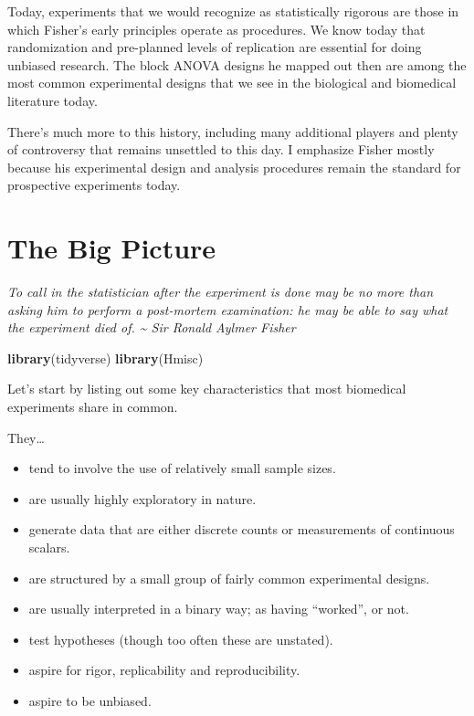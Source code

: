 \documentclass[]{book}
\newenvironment{Shaded}{\begin{snugshade}}{\end{snugshade}}
\newcommand{\KeywordTok}[1]{\textcolor[rgb]{0.13,0.29,0.53}{\textbf{#1}}}
\newcommand{\NormalTok}[1]{#1}
\providecommand{\tightlist}{%
  \setlength{\itemsep}{0pt}\setlength{\parskip}{0pt}}
\begin{document}
Today, experiments that we would recognize as statistically rigorous are those in which Fisher's early principles operate as procedures. We know today that randomization and pre-planned levels of replication are essential for doing unbiased research. The block ANOVA designs he mapped out then are among the most common experimental designs that we see in the biological and biomedical literature today.

There's much more to this history, including many additional players and plenty of controversy that remains unsettled to this day. I emphasize Fisher mostly because his experimental design and analysis procedures remain the standard for prospective experiments today.

\hypertarget{bigpic}{%
\chapter{The Big Picture}\label{bigpic}}

\emph{To call in the statistician after the experiment is done may be no more than asking him to perform a post-mortem examination: he may be able to say what the experiment died of. \textasciitilde{} Sir Ronald Aylmer Fisher}

\begin{Shaded}
\begin{Highlighting}[]
\KeywordTok{library}\NormalTok{(tidyverse)}
\KeywordTok{library}\NormalTok{(Hmisc)}
\end{Highlighting}
\end{Shaded}

Let's start by listing out some key characteristics that most biomedical experiments share in common.

They\ldots{}

\begin{itemize}
\tightlist
\item
  tend to involve the use of relatively small sample sizes.
\item
  are usually highly exploratory in nature.
\item
  generate data that are either discrete counts or measurements of continuous scalars.
\item
  are structured by a small group of fairly common experimental designs.
\item
  are usually interpreted in a binary way; as having ``worked'', or not.
\item
  test hypotheses (though too often these are unstated).
\item
  aspire for rigor, replicability and reproducibility.
\item
  aspire to be unbiased.
\end{itemize}
\end{document}
